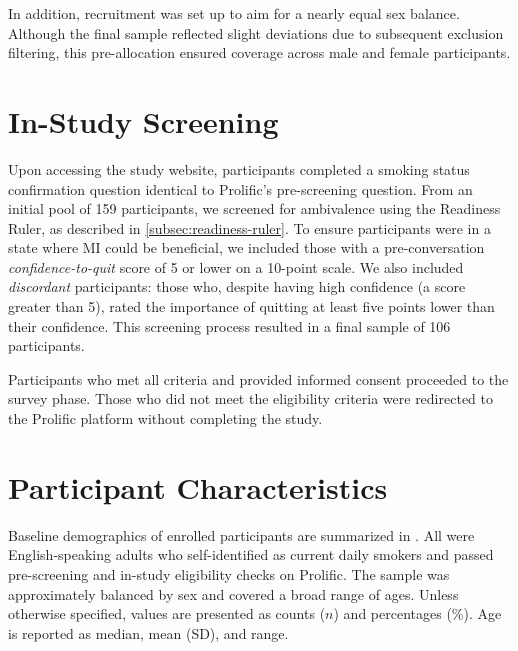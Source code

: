 In addition, recruitment was set up to aim for a nearly equal sex balance. Although the final sample reflected slight deviations due to subsequent exclusion filtering, this pre-allocation ensured coverage across male and female participants.

\section{In-Study Screening}
Upon accessing the study website, participants completed a smoking status confirmation question identical to Prolific's pre-screening question. From an initial pool of 159 participants, we screened for ambivalence using the Readiness Ruler, as described in \cref{subsec:readiness-ruler}. To ensure participants were in a state where MI could be beneficial, we included those with a pre-conversation \emph{confidence-to-quit} score of 5 or lower on a 10-point scale. We also included \emph{discordant}
participants: those who, despite having high confidence (a score greater than 5), rated the importance of quitting at least five points lower than their confidence. This screening process resulted in a final sample of 106 participants.

Participants who met all criteria and provided informed consent proceeded to the survey phase. Those who did not meet the eligibility criteria were redirected to the Prolific platform without completing the study.

\section{Participant Characteristics}
\label{subsec:participant-characteristics}
\noindent Baseline demographics of enrolled participants are summarized in . All were English-speaking adults who self-identified as current daily smokers and passed pre-screening and in-study eligibility checks on Prolific. The sample was approximately balanced by sex and covered a broad range of ages. Unless otherwise specified, values are presented as counts ($n$) and percentages (\%). Age is reported as median, mean (SD), and range.

